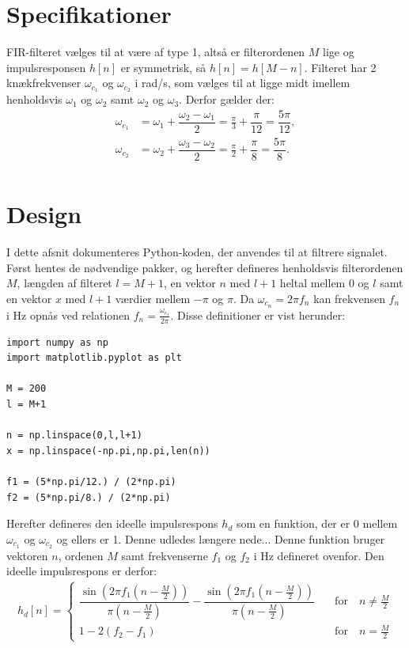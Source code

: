 \section{Specifikationer}
FIR-filteret vælges til at være af type 1, altså er filterordenen $M$ lige og impulsresponsen $h[n]$ er symmetrisk, så $h[n] = h[M - n]$. Filteret har 2 knækfrekvenser $\omega_{c_1}$ og $\omega_{c_2}$ i rad/s, som vælges til at ligge midt imellem henholdsvis $\omega_1$ og $\omega_2$ samt $\omega_2$ og $\omega_3$. Derfor gælder der:
\begin{align*}
\omega_{c_1} &= \omega_1 + \dfrac{\omega_2 - \omega_1}{2} = \frac{\pi}{3} + \dfrac{\pi}{12} = \dfrac{5\pi}{12}, \\
\omega_{c_2} &= \omega_2 + \dfrac{\omega_3 - \omega_2}{2} = \frac{\pi}{2} + \dfrac{\pi}{8} = \dfrac{5\pi}{8}. \\
\end{align*}

\section{Design}
I dette afsnit dokumenteres Python-koden, der anvendes til at filtrere signalet. Først hentes de nødvendige pakker, og herefter defineres henholdsvis filterordenen $M$, længden af filteret $l = M + 1$, en vektor $n$ med $l+1$ heltal mellem 0 og $l$ samt en vektor $x$ med $l+1$ værdier mellem $-\pi$ og $\pi$. Da $\omega_{c_n} = 2\pi f_n$ kan frekvensen $f_n$ i Hz opnås ved relationen $f_n = \frac{\omega_{c_1}}{2\pi}$. Disse definitioner er vist herunder:
\begin{lstlisting}
import numpy as np
import matplotlib.pyplot as plt

M = 200
l = M+1

n = np.linspace(0,l,l+1)
x = np.linspace(-np.pi,np.pi,len(n))

f1 = (5*np.pi/12.) / (2*np.pi)
f2 = (5*np.pi/8.) / (2*np.pi)
\end{lstlisting}

Herefter defineres den ideelle impulsrespons $h_d$ som en funktion, der er 0 mellem $\omega_{c_1}$ og $\omega_{c_2}$ og ellers er 1. Denne udledes længere nede... Denne funktion bruger vektoren $n$, ordenen $M$ samt frekvenserne $f_1$ og $f_2$ i Hz defineret ovenfor. Den ideelle impulsrespons er derfor:
\begin{align*}
h_d[n] = \begin{cases} \dfrac{\sin\left(2 \pi f_1\left(n - \frac{M}{2}\right)\right)}{\pi\left(n - \frac{M}{2}\right)} - \dfrac{\sin\left(2\pi f_1\left(n - \frac{M}{2}\right)\right)}{\pi\left(n - \frac{M}{2}\right)} \quad &\text{for} \quad n \neq \frac{M}{2} \\
1 - 2(f_2 - f_1) \quad &\text{for} \quad n = \frac{M}{2}
\end{cases}
\end{align*}

